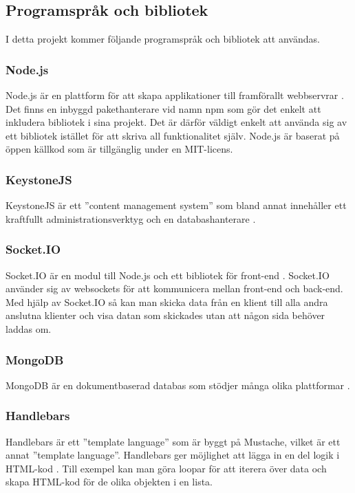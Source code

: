 \documentclass{article}
\begin{document}
\subsection{Programspråk och bibliotek}
I detta projekt kommer följande programspråk och bibliotek att användas.

\subsubsection{Node.js}
Node.js är en plattform för att skapa applikationer till framförallt webbservrar \cite{nodejs}. Det finns en inbyggd pakethanterare vid namn npm som gör det enkelt att inkludera bibliotek i sina projekt. Det är därför väldigt enkelt att använda sig av ett bibliotek istället för att skriva all funktionalitet själv. Node.js är baserat på öppen källkod som är tillgänglig under en MIT-licens.

\subsubsection{KeystoneJS}
KeystoneJS är ett ''content management system'' som bland annat innehåller ett kraftfullt administrationsverktyg och en databashanterare \cite{keystonejs}.

\subsubsection{Socket.IO}
Socket.IO är en modul till Node.js och ett bibliotek för front-end \cite{socketio}. Socket.IO använder sig av websockets för att kommunicera mellan front-end och back-end. Med hjälp av Socket.IO så kan man skicka data från en klient till alla andra anslutna klienter och visa datan som skickades utan att någon sida behöver laddas om.

\subsubsection{MongoDB}
MongoDB är en dokumentbaserad databas som stödjer många olika plattformar \cite{mongodb}.

\subsubsection{Handlebars}
Handlebars är ett ''template language'' som är byggt på Mustache, vilket är ett annat ''template language''. Handlebars ger möjlighet att lägga in en del logik i HTML-kod \cite{handlebars}. Till exempel kan man göra loopar för att iterera över data och skapa HTML-kod för de olika objekten i en lista.  
\end{document}
